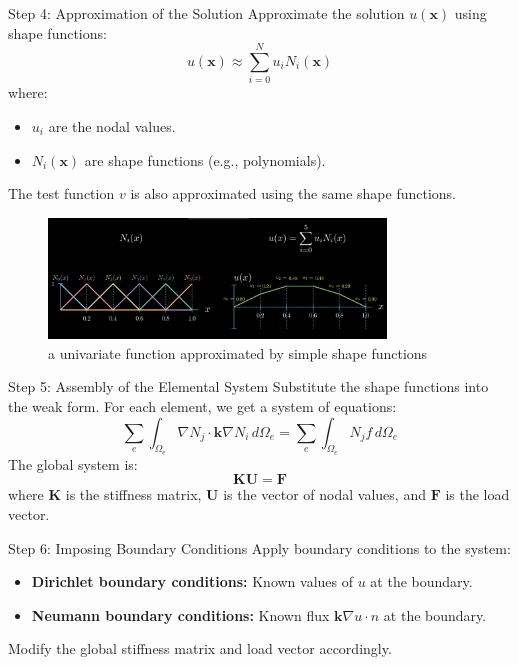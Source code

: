 \documentclass{beamer}
\begin{document}
\begin{frame}{Step 4: Approximation of the Solution}
    Approximate the solution \( u(\mathbf{x}) \) using shape functions:
    \[
    u(\mathbf{x}) \approx \sum_{i=0}^{N} u_i N_i(\mathbf{x})
    \]
    where:
    \begin{itemize}
        \item \( u_i \) are the nodal values.
        \item \( N_i(\mathbf{x}) \) are shape functions (e.g., polynomials).
    \end{itemize}
    The test function \( v \) is also approximated using the same shape functions.

  \begin{figure}
    \includegraphics[width=0.8\textwidth]{shape.png}
    \caption{a univariate function approximated by simple shape functions }
  \end{figure}
\end{frame}

\begin{frame}{Step 5: Assembly of the Elemental System}
    Substitute the shape functions into the weak form. For each element, we get a system of equations:
    \[
    \sum_{e} \int_{\Omega_e} \nabla N_j \cdot \mathbf{k} \nabla N_i \, d\Omega_e = \sum_{e} \int_{\Omega_e} N_j f \, d\Omega_e
    \]
    The global system is:
    \[
    \mathbf{K} \mathbf{U} = \mathbf{F}
    \]
    where \( \mathbf{K} \) is the stiffness matrix, \( \mathbf{U} \) is the vector of nodal values, and \( \mathbf{F} \) is the load vector.
\end{frame}

\begin{frame}{Step 6: Imposing Boundary Conditions}
    Apply boundary conditions to the system:
    \begin{itemize}
        \item \textbf{Dirichlet boundary conditions:} Known values of \( u \) at the boundary.
        \item \textbf{Neumann boundary conditions:} Known flux \( \mathbf{k} \nabla u \cdot \hat{n} \) at the boundary.
    \end{itemize}
    Modify the global stiffness matrix and load vector accordingly.
\end{frame}
\end{document}
